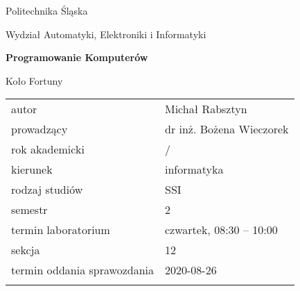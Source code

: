 \documentclass[12pt,a4paper,oneside]{article}
\newcounter{rok}
\newcommand{\rokakademicki}{%
   \setcounter{rok}{\number\year}%
   \ifthenelse{\number\month<10}%
   {\addtocounter{rok}{-1}}%
   {}%
   \arabic{rok}/\addtocounter{rok}{1}\arabic{rok}
}
\begin{document}
\frenchspacing
\thispagestyle{empty}
\begin{center}
{\Large\sf Politechnika Śląska   %

Wydział Automatyki, Elektroniki i Informatyki

}

\vfill

 

\vfill\vfill

{\Huge\sffamily\bfseries Programowanie Komputerów\par}  

\vfill\vfill

{\LARGE\sf Koło Fortuny}   


\vfill \vfill\vfill\vfill






\begin{tabular}{ll}
	\toprule
	autor                       & Michał Rabsztyn        	   \\
	prowadzący                  & dr inż. Bożena Wieczorek   \\
	rok akademicki              & \rokakademicki        	   \\
	kierunek                    & informatyka           	   \\
	rodzaj studiów              & SSI                    	   \\
	semestr                     & 2                      	   \\
	termin laboratorium         & czwartek, 08:30 -- 10:00 \\
	sekcja                      & 12                   	   \\
	termin oddania sprawozdania & 2020-08-26           	   \\
	\bottomrule
	                            &
\end{tabular}

\end{center}


\end{document}
